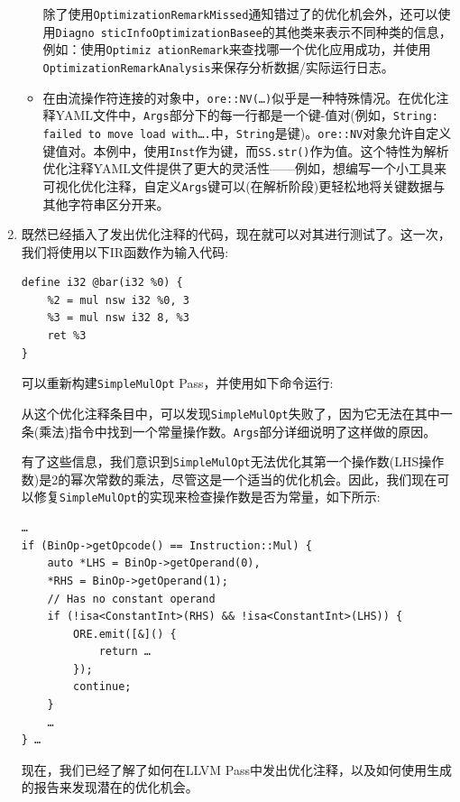 \begin{enumerate}
\begin{itemize}
除了使用\texttt{OptimizationRemarkMissed}通知错过了的优化机会外，还可以使用\texttt{Diagno sticInfoOptimizationBasee}的其他类来表示不同种类的信息，例如：使用\texttt{Optimiz ationRemark}来查找哪一个优化应用成功，并使用\texttt{OptimizationRemarkAnalysis}来保存分析数据/实际运行日志。

\item 在由流操作符连接的对象中，\texttt{ore::NV(…)}似乎是一种特殊情况。在优化注释YAML文件中，\texttt{Args}部分下的每一行都是一个键-值对(例如，\texttt{String: failed to
move load with….}中，\texttt{String}是键)。\texttt{ore::NV}对象允许自定义键值对。本例中，使用\texttt{Inst}作为键，而\texttt{SS.str()}作为值。这个特性为解析优化注释YAML文件提供了更大的灵活性——例如，想编写一个小工具来可视化优化注释，自定义\texttt{Args}键可以(在解析阶段)更轻松地将关键数据与其他字符串区分开来。

\end{itemize}

\item 既然已经插入了发出优化注释的代码，现在就可以对其进行测试了。这一次，我们将使用以下IR函数作为输入代码:

\begin{lstlisting}[style=styleCXX]
define i32 @bar(i32 %0) {
	%2 = mul nsw i32 %0, 3
	%3 = mul nsw i32 8, %3
	ret %3
}
\end{lstlisting}

可以重新构建\texttt{SimpleMulOpt} Pass，并使用如下命令运行:


从这个优化注释条目中，可以发现\texttt{SimpleMulOpt}失败了，因为它无法在其中一条(乘法)指令中找到一个常量操作数。\texttt{Args}部分详细说明了这样做的原因。

有了这些信息，我们意识到\texttt{SimpleMulOpt}无法优化其第一个操作数(LHS操作数)是2的幂次常数的乘法，尽管这是一个适当的优化机会。因此，我们现在可以修复\texttt{SimpleMulOpt}的实现来检查操作数是否为常量，如下所示:

\begin{lstlisting}[style=styleCXX]
…
if (BinOp->getOpcode() == Instruction::Mul) {
	auto *LHS = BinOp->getOperand(0),
	*RHS = BinOp->getOperand(1);
	// Has no constant operand
	if (!isa<ConstantInt>(RHS) && !isa<ConstantInt>(LHS)) {
		ORE.emit([&]() {
			return …
		});
		continue;
	}
	…
} …
\end{lstlisting}

现在，我们已经了解了如何在LLVM Pass中发出优化注释，以及如何使用生成的报告来发现潜在的优化机会。

\end{enumerate}

